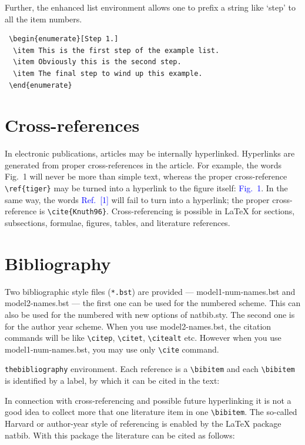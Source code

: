 \documentclass[a4paper,fleqn]{cas-dc}
\begin{document}
Further, the enhanced list environment allows one to prefix a
string like `step' to all the item numbers.  

\begin{verbatim}
 \begin{enumerate}[Step 1.]
  \item This is the first step of the example list.
  \item Obviously this is the second step.
  \item The final step to wind up this example.
 \end{enumerate}
\end{verbatim}

\section{Cross-references}
In electronic publications, articles may be internally
hyperlinked. Hyperlinks are generated from proper
cross-references in the article.  For example, the words
\textcolor{black!80}{Fig.~1} will never be more than simple text,
whereas the proper cross-reference \verb+\ref{tiger}+ may be
turned into a hyperlink to the figure itself:
\textcolor{blue}{Fig.~1}.  In the same way,
the words \textcolor{blue}{Ref.~[1]} will fail to turn into a
hyperlink; the proper cross-reference is \verb+\cite{Knuth96}+.
Cross-referencing is possible in \LaTeX{} for sections,
subsections, formulae, figures, tables, and literature
references.

\section{Bibliography}

Two bibliographic style files (\verb+*.bst+) are provided ---
{model1-num-names.bst} and {model2-names.bst} --- the first one can be
used for the numbered scheme. This can also be used for the numbered
with new options of {natbib.sty}. The second one is for the author year
scheme. When  you use model2-names.bst, the citation commands will be
like \verb+\citep+,  \verb+\citet+, \verb+\citealt+ etc. However when
you use model1-num-names.bst, you may use only \verb+\cite+ command.

\verb+thebibliography+ environment.  Each reference is a\linebreak
\verb+\bibitem+ and each \verb+\bibitem+ is identified by a label,
by which it can be cited in the text:

\noindent In connection with cross-referencing and
possible future hyperlinking it is not a good idea to collect
more that one literature item in one \verb+\bibitem+.  The
so-called Harvard or author-year style of referencing is enabled
by the \LaTeX{} package {natbib}. With this package the
literature can be cited as follows:
\end{document}
